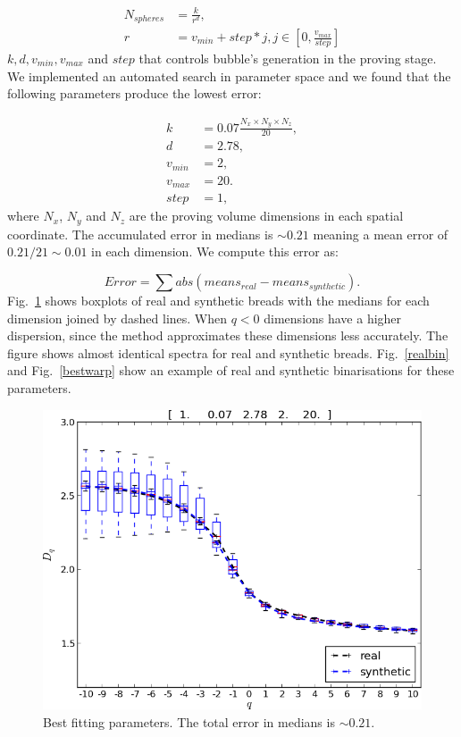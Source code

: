 \documentclass[final,5p,times]{elsarticle}
\begin{document}
{\begin{align}
N_{spheres} &= \frac{k}{r^{d}},\\ r &= v_{min}+step*j, j \in [0,\frac{v_{max}}{step}]
\end{align}
$k,d,v_{min},v_{max}$ and $step$ that controls bubble's generation in the proving stage. We implemented an automated search in parameter space and we found that the following parameters produce the lowest error:

\begin{align*}
k &= 0.07 \frac{N_{x}\times N_{y}\times N_{z}}{20} ,\\
d &=2.78,\\
v_{min} &=2,\\
v_{max} &=20.\\
step &=1,
\end{align*}
\noindent where $N_{x}$, $N_{y}$ and $N_{z}$ are the proving volume dimensions in each spatial coordinate. The accumulated error in medians is $\sim 0.21$ meaning a mean error of $0.21/21 \sim 0.01$  in each dimension. We compute this error as:

\begin{equation}
Error = \displaystyle \sum abs(means_{real}-means_{synthetic}).
\end{equation}
Fig.~\ref{bestboxplot} shows boxplots of real and synthetic breads with the medians for each dimension joined by dashed lines. When $q < 0$ dimensions have a higher dispersion, since the method approximates these dimensions less accurately. The figure shows almost identical spectra for real and synthetic breads.  Fig.~\ref{realbin} and  Fig.~\ref{bestwarp} show an example of real and synthetic binarisations for these parameters.

\begin{figure}[!ht]
\includegraphics[scale=0.5]{bestboxplot.png}
\caption{Best fitting parameters. The total error in medians is $\sim 0.21$.}
\label{bestboxplot}
\end{figure}

}
\end{document}
